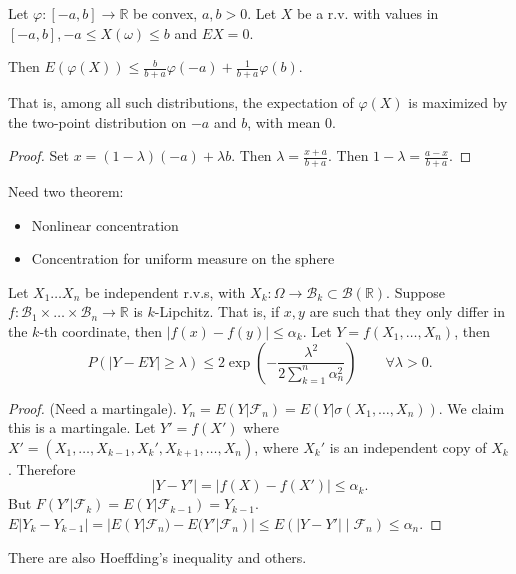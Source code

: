 \begin{corollary}
	Let $\varphi: [-a,b] \to \mathbb{R}$ be convex, $a,b > 0$. Let $X$ be a r.v. with values in $[-a, b], -a \le X(\omega) \le b$ and $E X = 0$. 

	Then $E(\varphi(X)) \le  \frac{b}{b+a}\varphi(-a) + \frac{1}{b + a}\varphi(b)$.

	That is, among all such distributions, the expectation of $\varphi(X)$ is maximized by the two-point distribution on $-a $ and $b$, with mean $0$.
\end{corollary}
\begin{proof}
	Set $x = (1 - \lambda) (-a) + \lambda b$. Then $\lambda = \frac{x + a}{b + a}$. Then $1 - \lambda = \frac{a - x}{b + a}$.
\end{proof}

Need two theorem:
\begin{itemize}
	\item Nonlinear concentration
	\item Concentration for uniform measure on the sphere
\end{itemize}

\begin{theorem}
	Let $X_1 \ldots X_n$ be independent r.v.s, with $X_k: \Omega \to \mathcal{B}_k \subset \mathcal{B}(\mathbb{R})$. Suppose $f: \mathcal{B}_1 \times \ldots \times \mathcal{B}_n \to  \mathbb{R}$ is $k$-Lipchitz. That is, if $x, y$ are such that they only differ in the $k$-th coordinate, then $|f(x) - f(y)| \le  \alpha_k$. Let $Y = f(X_1, \ldots, X_n)$, then
	\[
		P(|Y - EY| \ge \lambda)
		\le  2 \exp\left( - \frac{\lambda^2}{2 \sum_{k=1}^{n} \alpha^2_n} \right) 
		\qquad \forall \lambda>0
	.\] 
\end{theorem}
\begin{proof}
	(Need a martingale). $Y_n = E(Y | \mathcal{F}_n) = E(Y | \sigma(X_1, \ldots, X_n))$. We claim this is a martingale. Let $Y' = f(X')$ where $X' = \left( X_1, \ldots, X_{k-1 }, X_k', X_{k+1}, \ldots, X_n \right) $, where $X_k'$ is an independent copy of $X_k$. Therefore
	\[
		|Y - Y'| = |f(X) - f(X')| \le \alpha_k
	.\] 
	But $F(Y'| \mathcal{F}_k) = E(Y | \mathcal{F}_{k - 1}) = Y_{k - 1}$. $E|Y_k - Y_{k-1}| = |E(Y | \mathcal{F}_n) - E(Y' | \mathcal{F}_n)| \le  E\left( |Y - Y'| \middle| \mathcal{F}_n \right) \le  \alpha_n$.
\end{proof}

\begin{remark}
	There are also Hoeffding's inequality and others. 
\end{remark}





